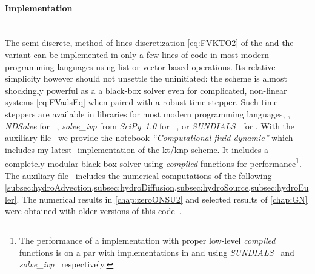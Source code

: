 \paragraph{Implementation}\label{paragraph:KTimp}\mbox{} \\
The semi-discrete, method-of-lines \fv{} discretization \eqref{eq:FVKTO2} of the \ktScheme{} and the \knp{} variant can be implemented in only a few lines of code in most modern programming languages using list or vector based operations.
Its relative simplicity however should not unsettle the uninitiated: the scheme is almost shockingly powerful as a a black-box solver even for complicated, non-linear systems \eqref{eq:FVadsEq} when paired with a robust \ode{} time-stepper.
Such time-steppers are available in libraries for most modern programming languages, \ie{}, \textit{NDSolve} for \WAM{}~\cite{Mathematica:12.1}, \textit{solve\_ivp} from \textit{SciPy~1.0} for \Python{}~\cite{2020SciPy-NMeth}, or \textit{SUNDIALS}~\cite{hindmarsh2005sundials,gardner2022sundials} for \Cpp{}.
With the auxiliary file~\cite{Steil:2023PhDFVNB} we provide the \WAM{} notebook \textit{``Computational fluid dynamic''} which includes my latest \WAM{}-implementation of the \acrshort{kt}/\acrshort{knp} scheme. 
It includes a completely modular black box solver using \textit{compiled} functions for performance\footnote{
	The performance of a \WAM{} implementation with proper low-level \textit{compiled} functions is on a par with implementations in \Cpp{} and \Python{} using \textit{SUNDIALS}~\cite{hindmarsh2005sundials,gardner2022sundials} and \textit{solve\_ivp}~\cite{2020SciPy-NMeth} respectively.
}.
The auxiliary file~\cite{Steil:2023PhDFVNB} includes the numerical computations of the following \cref{subsec:hydroAdvection,subsec:hydroDiffusion,subsec:hydroSource,subsec:hydroEuler}.
The numerical results in \cref{chap:zeroONSU2} and selected results of \cref{chap:GN} were obtained with older versions of this code~\cite{Steil:2023zeroD,Steil:2023zeroDN1,Steil:2023zeroDlargeN}.

